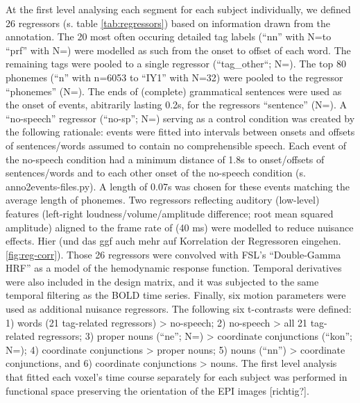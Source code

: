 \documentclass[10pt,a4paper,onecolumn]{article}
\begin{document}
At the first level analysing each segment for each subject individually, we defined 26 regressors (s. table \ref{tab:regressors})
 based on information drawn from the annotation. The 20 most often occuring detailed tag labels (``nn'' with N=\rNnAll\space to ``prf'' with N=\rPrfAll) were modelled as such from the onset to offset of each word. The remaining tags were pooled to a single regressor (``tag\_other``; N=\rTagotherAll). The top 80 phonemes (``n'' with n=6053 to ``IY1'' with N=32) were pooled to the regressor ``phonemes'' (N=\rPhonesAll).
The ends of (complete) grammatical sentences were used as the onset of events, abitrarily lasting 0.2s, for the regressors ``sentence'' (N=\rSentenceAll).
A ``no-speech'' regressor (``no-sp''; N=\rNospAll) serving as a control condition was created by the following rationale: events were fitted into intervals between onsets and offsets of sentences/words assumed to contain no comprehensible speech. Each event of the no-speech condition had a minimum distance of 1.8s to onset/offsets of sentences/words and to each other onset of the no-speech condition (s. anno2events-files.py). A length of 0.07s was chosen for these events matching the average length of phonemes.
Two regressors reflecting auditory (low-level) features (left-right loudness/volume/amplitude difference; root mean squared amplitude) aligned to the frame rate of (40 ms) were modelled to reduce nuisance effects.
Hier (und das ggf auch mehr auf Korrelation der Regressoren eingehen. \ref{fig:reg-corr}).
Those 26 regressors were convolved with FSL's ``Double-Gamma HRF'' as a model of the hemodynamic response function. Temporal derivatives were also included in the design matrix, and it was subjected to the same temporal filtering as the BOLD time series. Finally, six motion parameters were used as additional nuisance regressors.
The following six t-contrasts were defined: 1) words (21 tag-related regressors) > no-speech; 2) no-speech > all 21 tag-related regressors; 3) proper nouns (``ne''; N=\rNeAll) > coordinate conjunctions (``kon''; N=\rKonAll); 4) coordinate conjunctions > proper nouns; 5) nouns (``nn'') > coordinate conjunctions, and 6) coordinate conjunctions > nouns. The first level analysis that fitted each voxel’s time course separately for each subject was performed in functional space preserving the orientation of the EPI images [richtig?].
\end{document}

